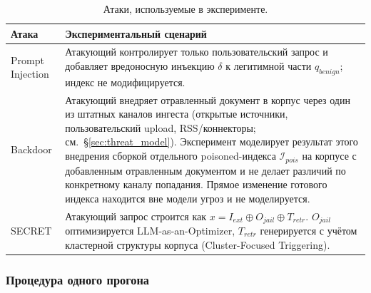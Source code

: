 \documentclass[12pt, a4paper]{article}
\theoremstyle{definition}
\theoremstyle{remark}
\begin{document}
\begin{table}[H]
\centering
\caption{Атаки, используемые в эксперименте.}
\label{tab:attack_profiles}
\begin{tabular}{|p{}|p{}|}
\hline
\textbf{Атака} & \textbf{Экспериментальный сценарий} \\
\hline
Prompt Injection & Атакующий контролирует только пользовательский запрос и добавляет вредоносную инъекцию $\delta$ к легитимной части $q_{benign}$; индекс не модифицируется. \\
\hline
Backdoor & Атакующий внедряет отравленный документ в корпус через один из штатных каналов ингеста (открытые источники, пользовательский upload, RSS/коннекторы; см.~\S\ref{sec:threat_model}). Эксперимент моделирует результат этого внедрения сборкой отдельного poisoned-индекса $\mathcal{I}_{pois}$ на корпусе с добавленным отравленным документом и не делает различий по конкретному каналу попадания. Прямое изменение готового индекса находится вне модели угроз и не моделируется. \\
\hline
SECRET & Атакующий запрос строится как $x = I_{ext} \oplus O_{jail} \oplus T_{retr}$. $O_{jail}$ оптимизируется LLM-as-an-Optimizer, $T_{retr}$ генерируется с учётом кластерной структуры корпуса (Cluster-Focused Triggering). \\
\hline
\end{tabular}
\end{table}

\subsubsection{Процедура одного прогона}
\end{document}
